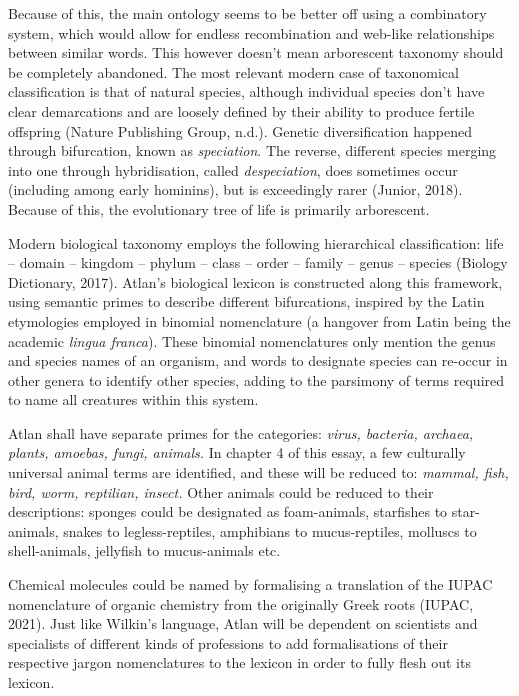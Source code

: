 Because of this, the main ontology seems to be better off using a combinatory system, which would allow for endless recombination and web-like relationships between similar words. This however doesn’t mean arborescent taxonomy should be completely abandoned. The most relevant modern case of taxonomical classification is that of natural species, although individual species don’t have clear demarcations and are loosely defined by their ability to produce fertile offspring (Nature Publishing Group, n.d.). Genetic diversification happened through bifurcation, known as {\it speciation}. The reverse, different species merging into one through hybridisation, called {\it despeciation}, does sometimes occur (including among early hominins), but is exceedingly rarer (Junior, 2018). Because of this, the evolutionary tree of life is primarily arborescent. 

Modern biological taxonomy employs the following hierarchical classification: life – domain – kingdom – phylum – class – order – family – genus – species (Biology Dictionary, 2017). Atlan’s biological lexicon is constructed along this framework, using semantic primes to describe different bifurcations, inspired by the Latin etymologies employed in binomial nomenclature (a hangover from Latin being the academic {\it lingua franca}). These binomial nomenclatures only mention the genus and species names of an organism, and words to designate species can re-occur in other genera to identify other species, adding to the parsimony of terms required to name all creatures within this system. 

Atlan shall have separate primes for the categories: \textit{virus, bacteria, archaea, plants, amoebas, fungi, animals.} In chapter 4 of this essay, a few culturally universal animal terms are identified, and these will be reduced to: \textit{mammal, fish, bird, worm, reptilian, insect.} Other animals could be reduced to their descriptions: sponges could be designated as foam-animals, starfishes to star-animals, snakes to legless-reptiles, amphibians to mucus-reptiles, molluscs to shell-animals, jellyfish to mucus-animals etc.  


Chemical molecules could be named by formalising a translation of the IUPAC nomenclature of organic chemistry from the originally Greek roots (IUPAC, 2021). Just like Wilkin’s language, Atlan will be dependent on scientists and specialists of different kinds of professions to add formalisations of their respective jargon nomenclatures to the lexicon in order to fully flesh out its lexicon. 

